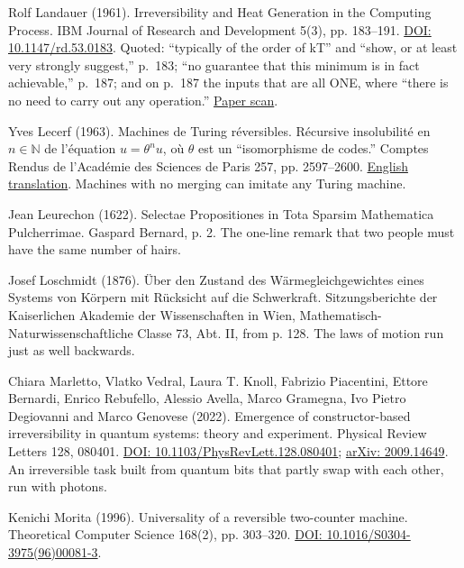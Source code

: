 \noindent Rolf Landauer (1961). Irreversibility and Heat Generation in the Computing Process. IBM Journal of Research and Development 5(3), pp. 183--191. \href{https://doi.org/10.1147/rd.53.0183}{DOI: 10.1147/rd.53.0183}. Quoted: ``typically of the order of kT'' and ``show, or at least very strongly suggest,'' p.~183; ``no guarantee that this minimum is in fact achievable,'' p.~187; and on p.~187 the inputs that are all ONE, where ``there is no need to carry out any operation.'' \href{https://fab.cba.mit.edu/classes/862.22/notes/computation/Landauer-1961.pdf}{Paper scan}.
\par\medskip

\noindent Yves Lecerf (1963). Machines de Turing r\'eversibles. R\'ecursive insolubilit\'e en $n \in \mathbb{N}$ de l'\'equation $u = \theta^n u$, o\`u $\theta$ est un ``isomorphisme de codes.'' Comptes Rendus de l'Acad\'emie des Sciences de Paris 257, pp. 2597--2600. \href{https://revcomp.info/legacy/mpf/rc/Lecerf/english/english.html}{English translation}. Machines with no merging can imitate any Turing machine.
\par\medskip

\noindent Jean Leurechon (1622). Selectae Propositiones in Tota Sparsim Mathematica Pulcherrimae. Gaspard Bernard, p. 2. The one-line remark that two people must have the same number of hairs.
\par\medskip

\noindent Josef Loschmidt (1876). \"Uber den Zustand des W\"armegleichgewichtes eines Systems von K\"orpern mit R\"ucksicht auf die Schwerkraft. Sitzungsberichte der Kaiserlichen Akademie der Wissenschaften in Wien, Mathematisch-Naturwissenschaftliche Classe 73, Abt. II, from p. 128. The laws of motion run just as well backwards.
\par\medskip

\noindent Chiara Marletto, Vlatko Vedral, Laura T. Knoll, Fabrizio Piacentini, Ettore Bernardi, Enrico Rebufello, Alessio Avella, Marco Gramegna, Ivo Pietro Degiovanni and Marco Genovese (2022). Emergence of constructor-based irreversibility in quantum systems: theory and experiment. Physical Review Letters 128, 080401. \href{https://doi.org/10.1103/PhysRevLett.128.080401}{DOI: 10.1103/PhysRevLett.128.080401}; \href{https://arxiv.org/abs/2009.14649}{arXiv: 2009.14649}. An irreversible task built from quantum bits that partly swap with each other, run with photons.
\par\medskip

\noindent Kenichi Morita (1996). Universality of a reversible two-counter machine. Theoretical Computer Science 168(2), pp. 303--320. \href{https://doi.org/10.1016/S0304-3975(96)00081-3}{DOI: 10.1016/S0304-3975(96)00081-3}.
\par\medskip

